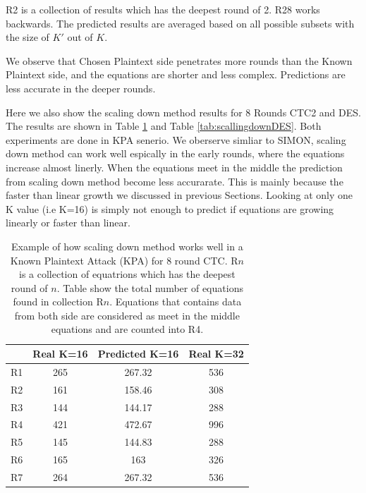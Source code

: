 R2 is a collection of results which has the deepest round of 2. R28 works backwards. 
The predicted results are averaged based on all possible subsets with the size of $K'$ out of $K$. 

We observe that Chosen Plaintext side penetrates more rounds than the Known Plaintext side, and the equations are shorter and less complex. Predictions are less accurate in the deeper rounds.

Here we also show the scaling down method results for 8 Rounds CTC2 and DES. The results are shown in Table \ref{tab:scallingdownCTC2} and 
Table \ref{tab:scallingdownDES}. Both experiments are done in KPA senerio. We oberserve simliar to SIMON, scaling down method can work well espically in the early rounds, where the equations increase almost linerly. When the equations meet in the middle the prediction from scaling down method become less accurarate. This is mainly because the faster than linear growth we discussed in previous Sections. Looking at only one K value (i.e K=16) is simply not enough to predict if equations are growing linearly or faster than linear.

\begin{table}[h!]
	\caption[Scaling down method results for 8 Rounds CTC2]{Example of how scaling down method works well in a Known Plaintext Attack (KPA) for 8 round CTC. R$n$ is a collection of equatrions which has the deepest round of $n$. Table show the total number of equations found in collection R$n$. Equations that contains data from both side are considered as meet in the middle equations and are counted into R4.} \label{tab:scallingdownCTC2} \centering
	\begin{tabular}{|c|c|c|c|}
		\hline
		& Real K=16 & Predicted K=16 & Real K=32 \\ \hline
		R1  & 265     &  267.32    & 536     \\ \hline
		R2  & 161     & 158.46     & 308     \\ \hline
		R3  & 144     & 144.17     & 288     \\ \hline
		R4  & 421     & 472.67     & 996     \\ \hline
		R5  & 145     & 144.83     & 288     \\ \hline
		R6  & 165     & 163          & 326     \\ \hline
		R7  & 264     & 267.32     & 536     \\ \hline
	\end{tabular}
\end{table}


